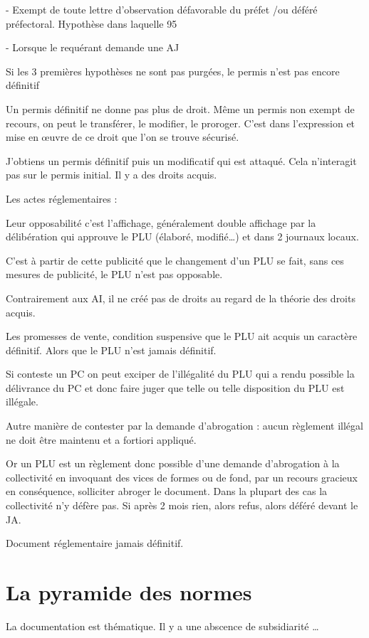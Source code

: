 		-	Exempt de toute lettre d’observation défavorable du préfet /ou déféré préfectoral. Hypothèse dans laquelle 95%

		-	Lorsque le requérant demande une AJ

		Si les 3 premières hypothèses ne sont pas purgées, le permis n’est pas encore définitif

		Un permis définitif ne donne pas plus de droit. Même un permis non exempt de recours, on peut le transférer, le modifier, le proroger. C’est dans l’expression et mise en œuvre de ce droit que l’on se trouve sécurisé.

		J’obtiens un permis définitif puis un modificatif qui est attaqué. Cela n’interagit pas sur le permis initial. Il y a des droits acquis.

		Les actes réglementaires : 

		Leur opposabilité c’est l’affichage, généralement double affichage par la délibération qui approuve le PLU (élaboré, modifié…) et dans 2 journaux locaux.

		C’est à partir de cette publicité que le changement d’un PLU se fait, sans ces mesures de publicité, le PLU n’est pas opposable.

		Contrairement aux AI, il ne créé pas de droits au regard de la théorie des droits acquis.

		Les promesses de vente, condition suspensive que le PLU ait acquis un caractère définitif. Alors que le PLU n’est jamais définitif.

		Si conteste un PC on peut exciper de l’illégalité du PLU qui a rendu possible la délivrance du PC et donc faire juger que telle ou telle disposition du PLU est illégale.

		Autre manière de contester par la demande d’abrogation : aucun règlement illégal ne doit être maintenu et a fortiori appliqué.

		Or un PLU est un règlement donc possible d’une demande d’abrogation à la collectivité en invoquant des vices de formes ou de fond, par un recours gracieux en conséquence, solliciter abroger le document. Dans la plupart des cas la collectivité n’y défère pas. Si après 2 mois rien, alors refus, alors déféré devant le JA.

		Document réglementaire jamais définitif.

		
	
	\section{La pyramide des normes}
	
		La documentation est thématique. Il y a une abscence de subsidiarité \dots